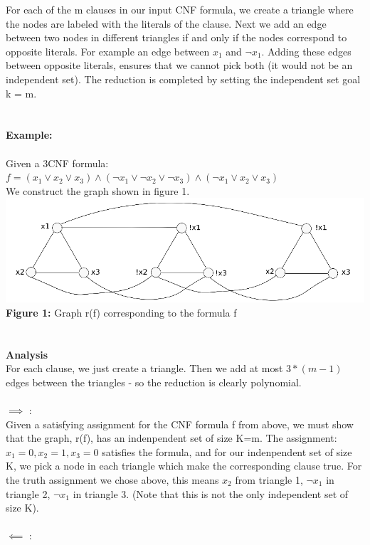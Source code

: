 \documentclass{article}
\begin{document}
For each of the m clauses in our input CNF formula, we create a triangle where the nodes are labeled with the literals of the clause. Next we add an edge between two nodes in different triangles if and only if the nodes correspond to opposite literals. For example an edge between $x_1$ and $\lnot x_1$. Adding these edges between opposite literals, ensures that we cannot pick both (it would not be an independent set). The reduction is completed by setting the independent set goal k = m. \\\\\\
\textbf{Example:}\\\\
Given a 3CNF formula:  $f =  (x_1 \lor x_2 \lor x_3) \land (\lnot x_1 \lor \lnot x_2 \lor \lnot x_3) \land (\lnot x_1 \lor x_2 \lor x_3)$\\
We construct the graph shown in figure 1. \\
\includegraphics[scale=0.5]{independentset}
\textbf{Figure 1:} Graph r(f) corresponding to the formula f\\\\\\
\textbf{Analysis}\\
For each clause, we just create a triangle. Then we add at most $3 * (m-1)$ edges between the triangles - so the reduction is clearly polynomial.
\\\\
$\implies$ :\\ Given a satisfying assignment for the CNF formula f from above, we must show that the graph, r(f), has an indenpendent set of size K=m. The assignment: $x_1 = 0, x_2 = 1, x_3 = 0$ satisfies the formula, and for our indenpendent set of size K, we pick a node in each triangle which make the corresponding clause true. For the truth assignment we chose above, this means $x_2$ from triangle 1, $\lnot x_1$ in triangle 2, $\lnot x_1$ in triangle 3. (Note that this is not the only independent set of size K).
\\\\
$\impliedby$ :\\
\end{document}

